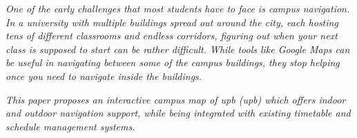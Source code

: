 \vspace*{\fill}
\noindent

\textit{One of the early challenges that most students have to face is campus navigation. In a university with multiple buildings spread out around the city, each hosting tens of different classrooms and endless corridors, figuring out when your next class is supposed to start can be rather difficult. While tools like Google Maps can be useful in navigating between some of the campus buildings, they stop helping once you need to navigate inside the buildings.}

\textit{This paper proposes an interactive campus map of \acrlong{upb} (\acrshort{upb}) which offers indoor and outdoor navigation support, while being integrated with existing timetable and schedule management systems.}

\vspace*{\fill}